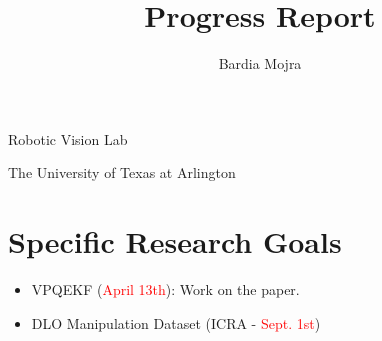 \documentclass[11pt]{article}
\title{Progress Report}
\author{Bardia Mojra}
\begin{document}
\maketitle
\thispagestyle{empty}

\bigskip
\bigskip
\begin{center}
 Robotic Vision Lab
\end{center}

\begin{center}
The University of Texas at Arlington
\end{center}

\newpage

\section{Specific Research Goals}
\begin{itemize}
      \item VPQEKF (\textcolor{red}{April 13th}): Work on the paper.
      \item DLO Manipulation Dataset (ICRA - \textcolor{red}{Sept. 1st})
\end{itemize}
\end{document}
